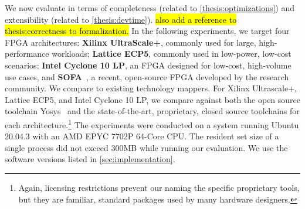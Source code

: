 \label{sec:evaluation}

We now evaluate
  \lr in terms of completeness
  (related to \cref{thesis:optimizations})
  and extensibility
  (related to \cref{thesis:devtime}).
\hl{also add a reference to thesis:correctness to formalization.}
In the following experiments,
  we target four FPGA architectures:
  \textbf{Xilinx UltraScale+},
  commonly used
  for large, high-performance workloads;
  \textbf{Lattice ECP5},
  commonly used 
  in low-power, low-cost scenarios;
  \textbf{Intel Cyclone 10 LP},
  an FPGA designed for low-cost,
  high-volume use cases,
  and 
  \textbf{SOFA}~\cite{sofa},
  a recent, open-source
  FPGA developed by the
  research community.
We compare \lr to existing
  technology mappers.
For
  Xilinx Ultrascale+, Lattice ECP5, and
  Intel Cyclone 10 LP,
  we compare \lr against both
  the open source toolchain Yosys~\cite{wolf2013yosys}
  and the
  state-of-the-art,
  proprietary, closed source
  toolchains
  for each architecture.\footnote{
    Again, licensing restrictions 
    prevent our naming the specific 
    proprietary tools, but
    they are familiar, standard packages 
    used by many hardware designers.}\tighten
The experiments were conducted 
  on a system running Ubuntu 20.04.3 
  with an AMD EPYC 7702P 64-Core CPU.
The resident set size of a single \lr process
  did not exceed
  300MB while running our evaluation.
We use the software versions listed in \cref{sec:implementation}.

